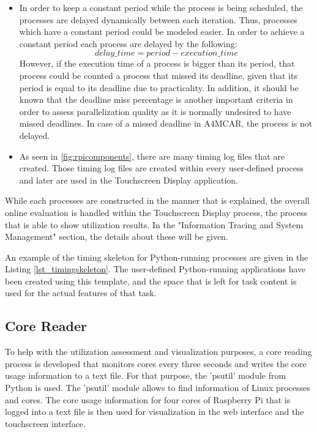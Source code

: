 \begin{itemize}
	\item In order to keep a constant period while the process is being scheduled, the processes are delayed dynamically between each iteration. Thus, processes which have a constant period could be modeled easier. In order to achieve a constant period each process are delayed by the following:
	\begin{equation}
	delay\texttt{\_}time=period - execution\texttt{\_}time
	\end{equation}
	However, if the execution time of a process is bigger than its period, that process could be counted a process that missed its deadline, given that its period is equal to its deadline due to practicality. In addition, it should be known that the deadline miss percentage is another important criteria in order to assess parallelization quality as it is normally undesired to have missed deadlines. In case of a missed deadline in A4MCAR, the process is not delayed.
	
	\item As seen in \ref{fig:rpicomponents}, there are many timing log files that are created. Those timing log files are created within every user-defined process and later are used in the Touchscreen Display application.
\end{itemize}

While each processes are constructed in the manner that is explained, the overall online evaluation is handled within the Touchscreen Display process, the process that is able to show utilization results. In the "Information Tracing and System Management" section, the details about these will be given.

An example of the timing skeleton for Python-running processes are given in the Listing \ref{lst_timingskeleton}. The user-defined Python-running applications have been created using this template, and the space that is left for task content is used for the actual features of that task.


\subsection{Core Reader}
To help with the utilization assessment and visualization purposes, a core reading process is developed that monitors cores every three seconds and writes the core usage information to a text file. For that purpose, the 'psutil' module \cite{psutil} from Python is used. The 'psutil' module allows to find information of Linux processes and cores. The core usage information for four cores of Raspberry Pi that is logged into a text file is then used for visualization in the web interface and the touchscreen interface. 

